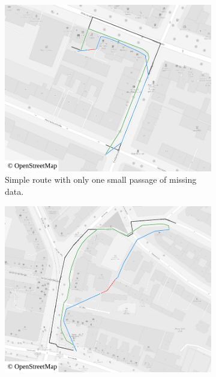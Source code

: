 			\clearpage
			\begin{figure}[h!]
				\begin{minipage}[t]{.48\textwidth}
					\begin{subfigure}[t]{\linewidth}
						\begin{figcenter}
							\includegraphics[width=\textwidth]{images/qgis-routing-city-routing-1}
						\end{figcenter}
						\caption{Simple route with only one small passage of missing data.}
						\label{fig:eval-city-usefulness-1}
					\end{subfigure}
				\end{minipage}
				\hfill
				\begin{minipage}[t]{.48\textwidth}
					\begin{subfigure}[t]{\linewidth}
						\begin{figcenter}
							\includegraphics[width=\textwidth]{images/qgis-routing-city-routing-3}

\end{figcenter}
\end{subfigure}
\end{minipage}
\end{figure}
